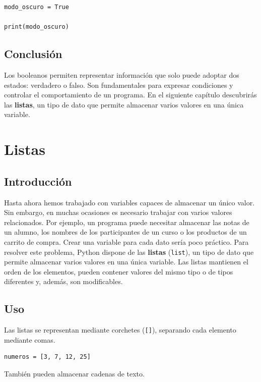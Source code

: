 \documentclass[11pt,a5paper,twoside]{book}
\begin{document}
\begin{tcolorbox}
\scriptsize
 \begin{verbatim}
modo_oscuro = True

print(modo_oscuro)
\end{verbatim}
\end{tcolorbox}
\subsection{Conclusión}
Los booleanos permiten representar información que solo puede adoptar dos estados: verdadero o falso. Son fundamentales para expresar condiciones y controlar el comportamiento de un programa.
En el siguiente capítulo descubrirás las \textbf{listas}, un tipo de dato que permite almacenar varios valores en una única variable.

\newpage

\section{Listas}
\subsection{Introducción}
Hasta ahora hemos trabajado con variables capaces de almacenar un único valor. Sin embargo, en muchas ocasiones es necesario trabajar con varios valores relacionados.
Por ejemplo, un programa puede necesitar almacenar las notas de un alumno, los nombres de los participantes de un curso o los productos de un carrito de compra.
Crear una variable para cada dato sería poco práctico. Para resolver este problema, Python dispone de las \textbf{listas} ({\scriptsize \texttt{list}}), un tipo de dato que permite almacenar varios valores en una única variable.
Las listas mantienen el orden de los elementos, pueden contener valores del mismo tipo o de tipos diferentes y, además, son modificables.
\subsection{Uso}
Las listas se representan mediante corchetes ({\scriptsize \texttt{[]}}), separando cada elemento mediante comas.


\begin{tcolorbox}
\scriptsize
 \begin{verbatim}
numeros = [3, 7, 12, 25]
\end{verbatim}
\end{tcolorbox}
También pueden almacenar cadenas de texto.
\end{document}

